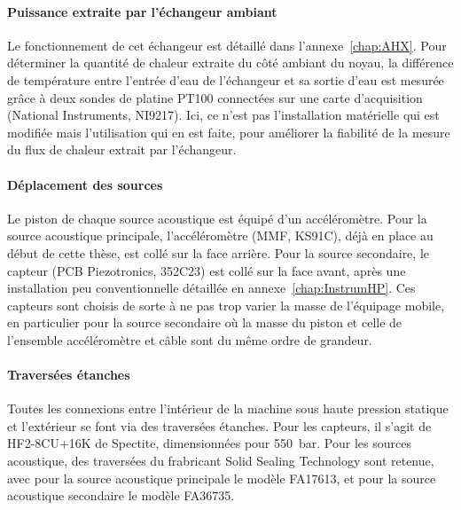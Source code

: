 \paragraph{Puissance extraite par l'échangeur ambiant} Le fonctionnement de cet échangeur est détaillé dans l'annexe~\ref{chap:AHX}. Pour déterminer la quantité de chaleur extraite du côté ambiant du noyau, la différence de température entre l'entrée d'eau de l'échangeur et sa sortie d'eau est mesurée grâce à deux sondes de platine PT100 connectées sur une carte d'acquisition (National Instruments, NI9217). Ici, ce n'est pas l'installation matérielle qui est modifiée mais l'utilisation qui en est faite, pour améliorer la fiabilité de la mesure du flux de chaleur extrait par l'échangeur.

\paragraph{Déplacement des sources} Le piston de chaque source acoustique est équipé d'un accéléromètre. Pour la source acoustique principale, l'accéléromètre (MMF, KS91C), déjà en place au début de cette thèse, est collé sur la face arrière. Pour la source secondaire, le capteur (PCB Piezotronics, 352C23) est collé sur la face avant, après une installation peu conventionnelle détaillée en annexe~\ref{chap:InstrumHP}. Ces capteurs sont choisis de sorte à ne pas trop varier la masse de l'équipage mobile, en particulier pour la source secondaire où la masse du piston et celle de l'ensemble accéléromètre et câble sont du même ordre de grandeur.

\paragraph{Traversées étanches} Toutes les connexions entre l'intérieur de la machine sous haute pression statique et l'extérieur se font via des traversées étanches. Pour les capteurs, il s'agit de HF2-8CU+16K de Spectite, dimensionnées pour \qty{550}{\bar}. Pour les sources acoustique, des traversées du frabricant Solid Sealing Technology sont retenue, avec pour la source acoustique principale le modèle FA17613, et pour la source acoustique secondaire le modèle FA36735. 



